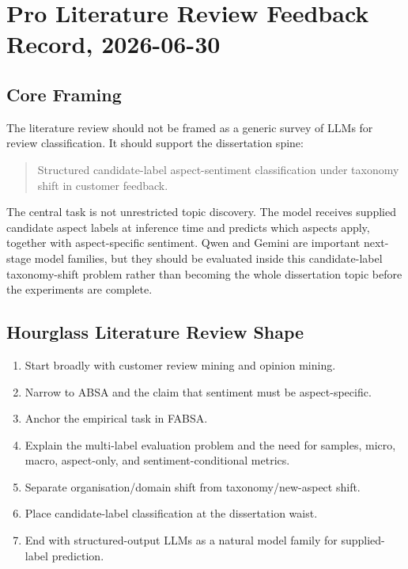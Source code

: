 
\section*{Pro Literature Review Feedback Record, 2026-06-30}

\subsection*{Core Framing}

The literature review should not be framed as a generic survey of LLMs for review classification. It should support the dissertation spine:

\begin{quote}
Structured candidate-label aspect-sentiment classification under taxonomy shift in customer feedback.
\end{quote}

The central task is not unrestricted topic discovery. The model receives supplied candidate aspect labels at inference time and predicts which aspects apply, together with aspect-specific sentiment. Qwen and Gemini are important next-stage model families, but they should be evaluated inside this candidate-label taxonomy-shift problem rather than becoming the whole dissertation topic before the experiments are complete.

\subsection*{Hourglass Literature Review Shape}

\begin{enumerate}
  \item Start broadly with customer review mining and opinion mining.
  \item Narrow to ABSA and the claim that sentiment must be aspect-specific.
  \item Anchor the empirical task in FABSA.
  \item Explain the multi-label evaluation problem and the need for samples, micro, macro, aspect-only, and sentiment-conditional metrics.
  \item Separate organisation/domain shift from taxonomy/new-aspect shift.
  \item Place candidate-label classification at the dissertation waist.
  \item End with structured-output LLMs as a natural model family for supplied-label prediction.
\end{enumerate}

